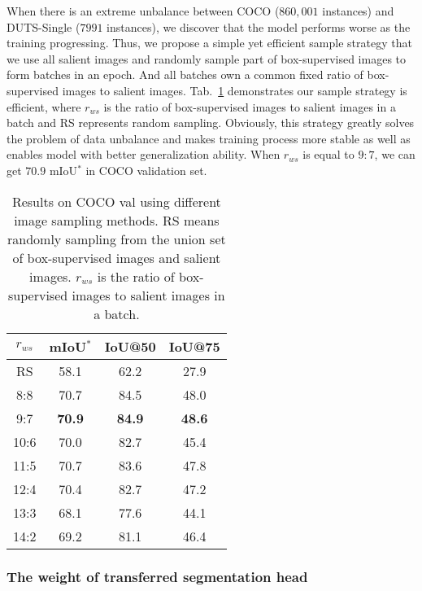 \documentclass[final]{cvpr}
\begin{document}
When there is an extreme unbalance between COCO ($860,001$ instances) and DUTS-Single ($7991$ instances), we discover that the model performs worse as the training progressing. Thus, we propose a simple yet efficient sample strategy that we use all salient images and randomly sample part of box-supervised images to form batches in an epoch. And all batches own a common fixed ratio of box-supervised images to salient images. Tab.~\ref{tab:COCOSampleVal} demonstrates our sample strategy is efficient, where $r_{ws}$ is the ratio of box-supervised images to salient images in a batch and RS represents random sampling. Obviously, this strategy greatly solves the problem of data unbalance and makes training process more stable as well as enables model with better generalization ability. When $r_{ws}$ is equal to $9:7$, we can get $70.9$ mIoU$^{*}$ in COCO validation set.



\begin{table}[htbp]
    \caption{Results on COCO val using different image sampling methods. RS means randomly sampling from the union set of box-supervised images and salient images. $r_{ws}$ is the ratio of box-supervised images to salient images in a batch.}
    \centering
    \resizebox{0.68\linewidth}{!}
    {
    \begin{tabular}{c|ccc}
        \toprule
        $r_{ws}$ & mIoU$^{*}$  & IoU@50 & IoU@75 \\
        \midrule
RS            & 58.1 & 62.2 & 27.9 \\
        8:8           & 70.7 & 84.5 & 48.0 \\
        9:7           & \textbf{70.9} & \textbf{84.9} & \textbf{48.6} \\
        10:6          & 70.0 & 82.7 & 45.4 \\
        11:5          & 70.7 & 83.6 & 47.8 \\
        12:4          & 70.4 & 82.7 & 47.2 \\
        13:3          & 68.1 & 77.6 & 44.1 \\
        14:2          & 69.2 & 81.1 & 46.4 \\
        \bottomrule
    \end{tabular}
    }
    \label{tab:COCOSampleVal}
\end{table}

\vspace{-3mm}
\subsubsection{The weight of transferred segmentation head}
\vspace{-1mm}
\end{document}
